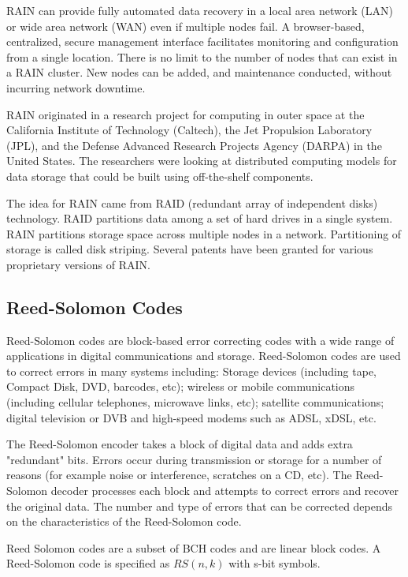 \documentclass[conference]{IEEEtran}
\begin{document}
RAIN can provide fully automated data recovery in a local area network (LAN) or wide area network (WAN) even if multiple nodes fail. A browser-based, centralized, secure management interface facilitates monitoring and configuration from a single location. There is no limit to the number of nodes that can exist in a RAIN cluster. New nodes can be added, and maintenance conducted, without incurring network downtime.

RAIN originated in a research project for computing in outer space at the California Institute of Technology (Caltech), the Jet Propulsion Laboratory (JPL), and the Defense Advanced Research Projects Agency (DARPA) in the United States. The researchers were looking at distributed computing models for data storage that could be built using off-the-shelf components.

The idea for RAIN came from RAID (redundant array of independent disks) technology. RAID partitions data among a set of hard drives in a single system. RAIN partitions storage space across multiple nodes in a network. Partitioning of storage is called disk striping. Several patents have been granted for various proprietary versions of RAIN.

\subsection{Reed-Solomon Codes}
Reed-Solomon codes\cite{reed1960polynomial} are block-based error correcting codes with a wide range of applications in digital communications and storage. Reed-Solomon codes are used to correct errors in many systems including: Storage devices (including tape, Compact Disk, DVD, barcodes, etc); wireless or mobile communications (including cellular telephones, microwave links, etc); satellite communications; digital television or DVB and high-speed modems such as ADSL, xDSL, etc.

The Reed-Solomon encoder takes a block of digital data and adds extra "redundant" bits. Errors occur during transmission or storage for a number of reasons (for example noise or interference, scratches on a CD, etc). The Reed-Solomon decoder processes each block and attempts to correct errors and recover the original data. The number and type of errors that can be corrected depends on the characteristics of the Reed-Solomon code.

Reed Solomon codes are a subset of BCH codes and are linear block codes. A Reed-Solomon code is specified as $RS(n,k)$ with s-bit symbols.
\end{document}

